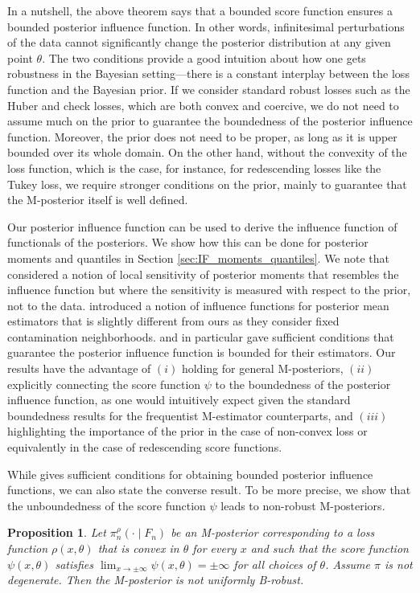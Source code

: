\documentclass[11pt, oneside]{amsart}
\newtheorem{proposition}{Proposition}
\theoremstyle{definition}   %
\newcommand{\loss}{\rho}
\newcommand{\score}{\psi}
\newcommand{\mposterior}{\pi_n^{\loss}}
\begin{document}
%
%
In a nutshell, the above theorem says that a bounded score function ensures a bounded posterior influence function. In other words, infinitesimal perturbations of the data cannot significantly change the posterior distribution at any given point \(\theta\). The two conditions provide a good intuition about how one gets robustness in the Bayesian setting---there is a constant interplay between the loss function and the Bayesian prior. If we consider standard robust losses such as the Huber and check losses, which are both convex and coercive, we do not need to assume much on the prior to guarantee the boundedness of the posterior influence function. Moreover, the prior does not need to be proper, as long as it is upper bounded over its whole domain. On the other hand, without the convexity of the loss function, which is the case, for instance, for redescending losses like the Tukey loss, we require stronger conditions on the prior, mainly to guarantee that the M-posterior itself is well defined.

%
Our posterior influence function can be used to derive the influence function of functionals of the posteriors. We show how this can be done for posterior moments and quantiles in Section \ref{sec:IF_moments_quantiles}. We note that \cite{gustafson1996,gustafson2000} considered a notion of local sensitivity of posterior moments that resembles the influence function but where the sensitivity is measured with respect to the prior, not to the data. \cite{hooker:vidyashankar2014} introduced a notion of influence functions for posterior mean estimators that is slightly different from ours as they consider fixed contamination neighborhoods. \cite{ghosh:basu2016} and in particular \cite{matsubara:knoblauch:briol:oates2022,altamirano:briol:knoblauch2023} gave sufficient conditions that guarantee the posterior influence function is bounded for their estimators. Our results have the advantage of $(i)$ holding for general M-posteriors, $(ii)$ explicitly connecting the score function $\psi$ to the boundedness of the posterior influence function, as one would intuitively expect given the standard boundedness results for the frequentist M-estimator counterparts, and $(iii)$ highlighting the importance of the prior in the case of non-convex loss or equivalently in the case of  redescending score functions.
%

While  gives sufficient conditions for obtaining  bounded posterior influence functions, we can also state the converse result. To be more precise, we show that the unboundedness of the score function \( \psi \) leads to non-robust M-posteriors.
%
\begin{proposition}
\label{prop::unbounded-score-implies-non-robust-posterior}
    Let \( \mposterior (\cdot \mid F_n) \) be an M-posterior corresponding to a loss function \(\loss(x, \theta)\) that is convex in \( \theta \) for every \( x \) and such that the score function \( \score(x, \theta) \) satisfies \(\lim_{x \rightarrow \pm \infty} \psi (x, \theta) = \pm \infty \) for all choices of \(\theta\). Assume \( \pi\) is not degenerate. Then the M-posterior is not uniformly B-robust.  
\end{proposition}
%
%
\end{document}
